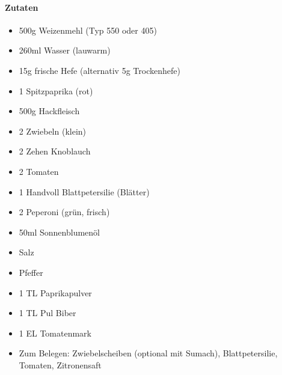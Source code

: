 \newpage
{}
\paragraph{Zutaten}
\begin{itemize}[noitemsep]
	\item 500g Weizenmehl (Typ 550 oder 405)
	\item 260ml Wasser (lauwarm)
	\item 15g frische Hefe (alternativ 5g Trockenhefe)
	\vspace{0.5cm}
	\item 1 Spitzpaprika (rot)
	\item 500g Hackfleisch
	\item 2 Zwiebeln (klein)
	\item 2 Zehen Knoblauch
	\item 2 Tomaten
	\item 1 Handvoll Blattpetersilie (Blätter)
	\item 2 Peperoni (grün, frisch)
	\item 50ml Sonnenblumenöl
	\item Salz
	\item Pfeffer
	\item 1 TL Paprikapulver
	\item 1 TL Pul Biber
	\item 1 EL Tomatenmark
	\item Zum Belegen: Zwiebelscheiben (optional mit Sumach), Blattpetersilie, Tomaten, Zitronensaft
\end{itemize}


